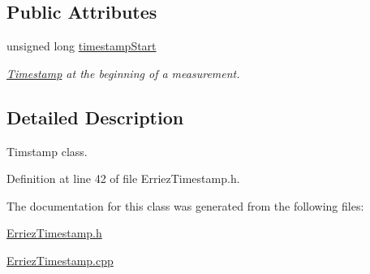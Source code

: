 \subsection*{Public Attributes}
\begin{DoxyCompactItemize}
\item 
unsigned long \hyperlink{class_timestamp_a739ba1083f1fadbe790499c9942880af}{timestamp\+Start}\hypertarget{class_timestamp_a739ba1083f1fadbe790499c9942880af}{}\label{class_timestamp_a739ba1083f1fadbe790499c9942880af}

\begin{DoxyCompactList}\small\item\em \hyperlink{class_timestamp}{Timestamp} at the beginning of a measurement. \end{DoxyCompactList}\end{DoxyCompactItemize}


\subsection{Detailed Description}
Timstamp class. 

Definition at line 42 of file Erriez\+Timestamp.\+h.



The documentation for this class was generated from the following files\+:\begin{DoxyCompactItemize}
\item 
\hyperlink{_erriez_timestamp_8h}{Erriez\+Timestamp.\+h}\item 
\hyperlink{_erriez_timestamp_8cpp}{Erriez\+Timestamp.\+cpp}\end{DoxyCompactItemize}
